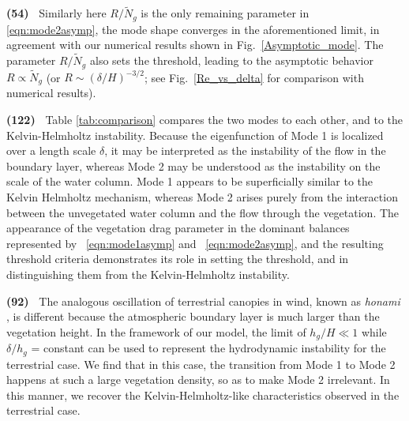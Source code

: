 \documentclass[aps,prl,reprint,twocolumn,superscriptaddress,sort&compress,10pt]{revtex4-1}  %
\newcommand{\hg}{h_g}
\newcommand{\Rey}{{R}}
\newcommand{\Ndg}{\tilde{N}_g}
\newcommand{\words}[1]{\textbf{(#1)~}}
\begin{document}
\words{54} Similarly here $\Rey/\Ndg$ is the only remaining parameter in \eqref{eqn:mode2asymp}, the mode shape converges in the aforementioned limit, in agreement with our numerical results shown in Fig.~\ref{Asymptotic_mode}. 
The parameter $\Rey/\Ndg$ also sets the threshold, leading to the asymptotic behavior $\Rey \propto \Ndg$ (or $\Rey \sim ({\delta}/{H})^{-3/2}$; see Fig.~\ref{Re_vs_delta} for comparison with numerical results).

\words{122} Table \ref{tab:comparison} compares the two modes to each other, and to the Kelvin-Helmholtz instability. 
Because the eigenfunction of Mode 1 is localized over a length scale $\delta$, it may be interpreted as the instability of the flow in the boundary layer, whereas Mode 2 may be understood as the instability on the scale of the water column. 
Mode 1 appears to be superficially similar to the Kelvin Helmholtz mechanism, whereas Mode 2 arises purely from the interaction between the unvegetated water column and the flow through the vegetation. 
The appearance of the vegetation drag parameter in the dominant balances represented by ~\eqref{eqn:mode1asymp} and ~\eqref{eqn:mode2asymp}, and the resulting threshold criteria demonstrates its role in setting the threshold, and in distinguishing them from the Kelvin-Helmholtz instability.

\words{92} The analogous oscillation of terrestrial canopies in wind, known as \textit{honami} \cite{Inoue56,Raupach96}, is different because the atmospheric boundary layer is much larger than the vegetation height.
In the framework of our model, the limit of $\hg/H \ll 1$ while $\delta/\hg$ = constant can be used to represent the hydrodynamic instability for the terrestrial case.
We find that in this case, the transition from Mode 1 to Mode 2 happens at such a large vegetation density, so as to make Mode 2 irrelevant. 
In this manner, we recover the Kelvin-Helmholtz-like characteristics observed in the terrestrial case. 
\end{document}

